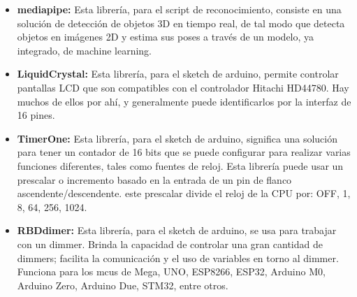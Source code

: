 \begin{itemize}
    \item \textbf{mediapipe:} Esta librería, para el script de reconocimiento, consiste  en una solución de detección de objetos 3D en tiempo real, de tal modo que detecta objetos en imágenes 2D y estima sus poses a través de un modelo, ya integrado, de machine learning.
    \item \textbf{LiquidCrystal:} Esta librería, para el sketch de arduino, permite controlar pantallas LCD que son compatibles con el controlador Hitachi HD44780. Hay muchos de ellos por ahí, y generalmente puede identificarlos por la interfaz de 16 pines.
    \item \textbf{TimerOne:} Esta librería, para el sketch de arduino, significa una solución  para tener un contador de 16 bits que se puede configurar para realizar varias funciones diferentes, tales como fuentes de reloj. Esta librería puede usar un prescalar o incremento basado en la entrada de un pin de flanco ascendente/descendente. este prescalar divide el reloj de la CPU por: OFF, 1, 8, 64, 256, 1024.
    \item \textbf{RBDdimer:} Esta librería, para el sketch de arduino, se usa para trabajar con un dimmer. Brinda la capacidad de controlar una gran cantidad de dimmers; facilita la comunicación y el uso de variables en torno al dimmer. Funciona para los mcus de Mega, UNO, ESP8266, ESP32, Arduino M0, Arduino Zero, Arduino Due, STM32, entre otros.
\end{itemize}



